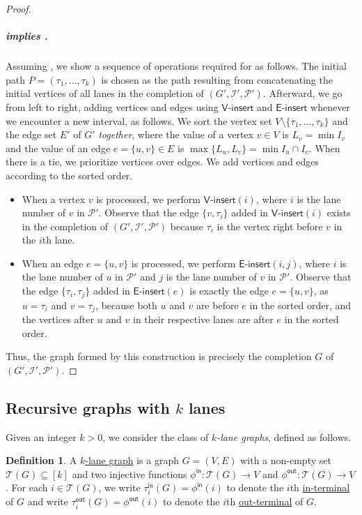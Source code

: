 \documentclass[11pt]{article}
\theoremstyle{definition}
\newtheorem{definition}[lemma]{Definition}
\theoremstyle{remark}
\newcommand{\tin}{\tau^{\mathsf{in}}}
\newcommand{\tout}{\tau^{\mathsf{out}}}
\newcommand{\fin}{\phi^{\mathsf{in}}}
\newcommand{\fout}{\phi^{\mathsf{out}}}
\newcommand{\insv}{\mathsf{V}\text{-}\mathsf{insert}}
\newcommand{\inse}{\mathsf{E}\text{-}\mathsf{insert}}
\begin{document}
\begin{proof}
\subparagraph{ implies .} Assuming , we show a sequence of operations required for  as follows. The initial path $P = (\tau_1, \ldots, \tau_k)$ is chosen as the path resulting from concatenating the initial vertices of all lanes in the completion of $(G', \mathcal{I}', \mathcal{P}')$. Afterward, we go from left to right, adding vertices and edges using $\insv$ and $\inse$ whenever we encounter a new interval, as follows. We sort the vertex set $V \setminus \{\tau_1, \ldots, \tau_k\}$ and the edge set $E'$ of $G'$ \emph{together}, where the value of a vertex $v \in V$ is $L_v = \min I_v$ and the value of an edge $e=\{u,v\} \in E$ is $\max \{L_u, L_v\} = \min I_u \cap I_v$. When there is a tie, we prioritize vertices over edges.
We add vertices and edges according to the sorted order. 
\begin{itemize}
    \item When a vertex $v$ is processed, we perform $\insv(i)$, where $i$ is the lane number of $v$ in $\mathcal{P}'$. Observe that the edge $\{v, \tau_i\}$ added in $\insv(i)$ exists in the completion of $(G', \mathcal{I}', \mathcal{P}')$ because $\tau_i$ is the vertex right before $v$ in the $i$th lane.
    \item When an edge $e=\{u,v\}$ is processed, we perform $\inse(i,j)$, where $i$ is the lane number of $u$ in $\mathcal{P}'$ and $j$ is the lane number of $v$ in $\mathcal{P}'$. Observe that the edge $\{\tau_i, \tau_j\}$ added in $\inse(e)$  is exactly the edge $e=\{u,v\}$, as $u=\tau_i$ and $v=\tau_j$, because both $u$ and $v$ are before $e$ in the sorted order, and the vertices after $u$ and $v$ in their respective lanes are after $e$ in the sorted order.
\end{itemize}
Thus, the graph formed by this construction is precisely the completion $G$ of $(G', \mathcal{I}', \mathcal{P}')$.
\end{proof}

\subsection{Recursive graphs with \texorpdfstring{$k$}{k} lanes}\label{sect:recursive_merge}

Given an integer $k > 0$, we consider the class of \emph{$k$-lane graphs}, defined as follows.

\begin{definition}\label{def:lane_graph}
    A \ul{$k$-lane graph} is a graph $G=(V,E)$ with a non-empty set $\mathcal{T}(G) \subseteq [k]$ and two injective functions $\fin: \mathcal{T}(G) \rightarrow V$ and $\fout: \mathcal{T}(G) \rightarrow V$. For each $i \in \mathcal{T}(G)$, we write $\tin_i(G) = \fin(i)$ to denote the $i$th \ul{in-terminal} of $G$ and write $\tout_i(G) = \fout(i)$ to denote the $i$th \ul{out-terminal} of $G$.  
\end{definition}
\end{document}
